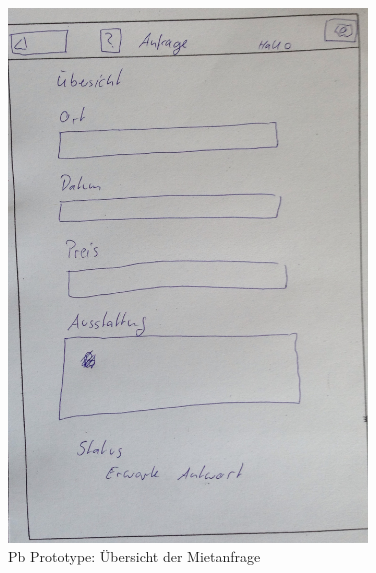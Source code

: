 \begin{figure}[H]
\centering
\includegraphics[angle=90, width=0.85\textwidth]{./images/paperbased/anfrageuebersicht.JPG}
\caption{Pb Prototype: Übersicht der Mietanfrage}
\label{pbprototype3}
\end{figure}

